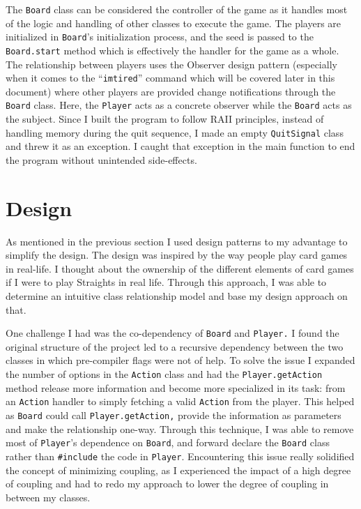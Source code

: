 \documentclass[12pt]{article}
\begin{document}
		The \texttt{Board} class can be considered the controller of the game as it handles most of the logic and handling of other classes to execute the game. The players are initialized in \texttt{Board}'s initialization process, and the seed is passed to the \texttt{Board.start} method which is effectively the handler for the game as a whole. The relationship between players uses the Observer design pattern (especially when it comes to the ``\texttt{imtired}'' command which will be covered later in this document) where other players are provided change notifications through the \texttt{Board} class. Here, the \texttt{Player} acts as a concrete observer while the \texttt{Board} acts as the subject. Since I built the program to follow RAII principles, instead of handling memory during the quit sequence, I made an empty \texttt{QuitSignal} class and threw it as an exception. I caught that exception in the main function to end the program without unintended side-effects.

	\section{Design}
		As mentioned in the previous section I used design patterns to my advantage to simplify the design. The design was inspired by the way people play card games in real-life. I thought about the ownership of the different elements of card games if I were to play Straights in real life. Through this approach, I was able to determine an intuitive class relationship model and base my design approach on that.

		One challenge I had was the co-dependency of \texttt{Board} and \texttt{Player.} I found the original structure of the project led to a recursive dependency between the two classes in which pre-compiler flags were not of help. To solve the issue I expanded the number of options in the \texttt{Action} class and had the \texttt{Player.getAction} method release more information and become more specialized in its task: from an \texttt{Action} handler to simply fetching a valid \texttt{Action} from the player. This helped as \texttt{Board} could call \texttt{Player.getAction,} provide the information as parameters and make the relationship one-way. Through this technique, I was able to remove most of \texttt{Player}'s dependence on \texttt{Board}, and forward declare the \texttt{Board} class rather than \texttt{\#include} the code in \texttt{Player}.
		Encountering this issue really solidified the concept of minimizing coupling, as I experienced the impact of a high degree of coupling and had to redo my approach to lower the degree of coupling in between my classes.
\end{document}
